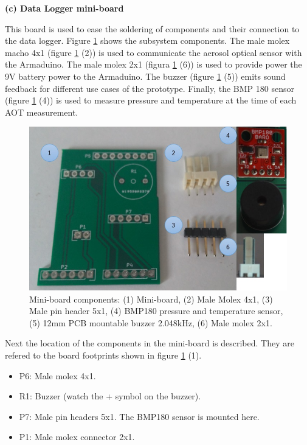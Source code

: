 \documentclass[12pt,letterpaper]{article}
\numberwithin{figure}{section}
\numberwithin{equation}{section}
\numberwithin{table}{section}
\begin{document}
\begin{flushleft}
\textbf{(c) Data Logger mini-board}
\end{flushleft}

This board is used to ease the soldering of components and their connection to the data logger. Figure \ref{fig:17} shows the subsystem components. The male molex macho 4x1 (figure \ref{fig:17} (2)) is used to communicate the aerosol optical sensor with the Armaduino. The male molex 2x1 (figura \ref{fig:17} (6)) is used to provide power the 9V battery power to the Armaduino. The buzzer (figure \ref{fig:17} (5)) emits sound feedback for different use cases of the prototype. Finally, the BMP 180 sensor (figure \ref{fig:17} (4)) is used to measure pressure and temperature at the time of each AOT measurement.

\begin{figure}[H]
    \centering
    \includegraphics[scale=0.5]{Figuras/figure_17.jpg}
    \caption{Mini-board components: (1) Mini-board, (2) Male Molex 4x1, (3) Male pin header 5x1, (4) BMP180 pressure and temperature sensor, (5) 12mm PCB mountable buzzer 2.048kHz, (6) Male molex 2x1.}
    \label{fig:17}
\end{figure}

Next the location of the components in the mini-board is described. They are refered to the board footprints shown in figure \ref{fig:17} (1).

\begin{itemize}
    \item P6: Male molex 4x1.
    \item R1: Buzzer (watch the + symbol on the buzzer).
    \item P7: Male pin headers 5x1. The BMP180 sensor is mounted here.
    \item P1: Male molex connector 2x1.
\end{itemize}
\end{document}
